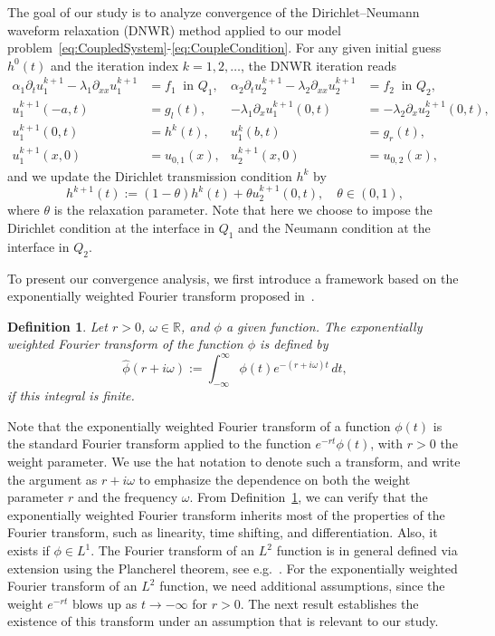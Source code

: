 \documentclass[reqno]{amsart}
\newtheorem{definition}{Definition}
\begin{document}
The goal of our study is to analyze convergence of the Dirichlet--Neumann waveform relaxation (DNWR) method applied to our model problem~\eqref{eq:CoupledSystem}-\eqref{eq:CoupleCondition}. For any given initial guess $h^0(t)$ and the iteration index $k = 1, 2, \ldots$, the DNWR iteration reads
\begin{equation}\label{eq:DNWR}
\begin{aligned}
	\alpha_1 \partial_t u_1^{k+1} - \lambda_1 \partial_{xx} u_1^{k+1} &= f_1 \ \text{ in } Q_1,&
	\alpha_2 \partial_t u_2^{k+1} - \lambda_2 \partial_{xx} u_2^{k+1} &= f_2 \ \text{ in } Q_2, \\
	u_1^{k+1}(-a, t) &= g_l(t), \ &
	-\lambda_1 \partial_x u_1^{k+1}(0, t) &= -\lambda_2 \partial_x u_2^{k+1}(0, t), \\
	u_1^{k+1}(0, t) &= h^{k}(t), &
	u_1^k(b, t) &= g_r(t), \\
	u_1^{k+1}(x, 0) &= u_{0, 1}(x), &
	u_2^{k+1}(x, 0) &= u_{0, 2}(x),
\end{aligned}
\tag{DNWR}
\end{equation}
and we update the Dirichlet transmission condition $h^k$ by
\[h^{k+1}(t) := (1-\theta) h^k(t) + \theta u^{k+1}_2(0, t),
\quad
\theta \in (0, 1),\]
where $\theta$ is the relaxation parameter. Note that here we choose to impose the Dirichlet condition at the interface in $Q_1$ and the Neumann condition at the interface in $Q_2$. 

To present our convergence analysis, we first introduce a framework based on the exponentially weighted Fourier transform proposed in~\cite{Kwok2025}.


\begin{definition}\label{def:FourierTransform}
Let $r>0$, $\omega\in\mathbb{R}$, and $\phi$ a given function. The exponentially weighted Fourier transform of the function $\phi$ is defined by
\[\hat{\phi}(r + i\omega) :=  \int_{-\infty}^{\infty} \phi(t) e^{-(r+i \omega) t} \, dt,\] 
if this integral is finite.
\end{definition}
Note that the exponentially weighted Fourier transform of a function $\phi(t)$ is the standard Fourier transform applied to the function $e^{-rt}\phi(t)$, with $r>0$ the weight parameter. We use the hat notation to denote such a transform, and write the argument as $r+i\omega$ to emphasize the dependence on both the weight parameter $r$ and the frequency $\omega$. From Definition~\ref{def:FourierTransform}, we can verify that the exponentially weighted Fourier transform inherits most of the properties of the Fourier transform, such as linearity, time shifting, and differentiation. Also, it exists if $\phi\in L^1$. 
The Fourier transform of an $L^2$ function is in general defined via extension using the Plancherel theorem, see e.g.~\cite{grafakos2014a}. For the exponentially weighted Fourier transform of an $L^2$ function, we need additional assumptions, since the weight $e^{-rt}$ blows up as $t\to-\infty$ for $r>0$. The next result establishes the existence of this transform under an assumption that is relevant to our study.
\end{document}
